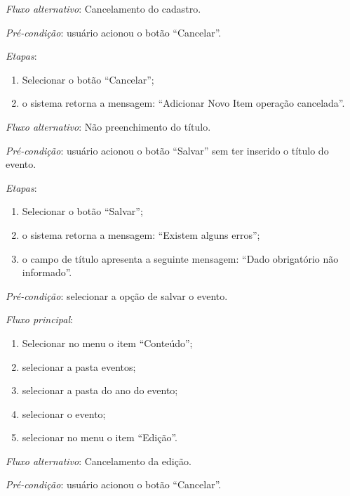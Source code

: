 \noindent \textit{Fluxo alternativo}: Cancelamento do cadastro.

\noindent \textit{Pré-condição}:  usuário acionou o botão ``Cancelar''.

\noindent \textit{Etapas}:

\begin{enumerate}
    \item Selecionar o botão ``Cancelar'';
    \item o sistema retorna a mensagem: ``Adicionar Novo Item operação cancelada''.
\end{enumerate}

\noindent \textit{Fluxo alternativo}: Não preenchimento do título.

\noindent \textit{Pré-condição}: usuário acionou o botão ``Salvar'' sem ter inserido o título do evento.

\noindent \textit{Etapas}:

\begin{enumerate}
    \item Selecionar o botão ``Salvar'';
    \item o sistema retorna a mensagem: ``Existem alguns erros'';
    \item o campo de título apresenta a seguinte mensagem: ``Dado obrigatório não informado''.
\end{enumerate}



\vspace{0.7cm}

\noindent \textit{Pré-condição}: selecionar a opção de salvar o evento.

\noindent \textit{Fluxo principal}:

\begin{enumerate}
    \item Selecionar no menu o item ``Conteúdo'';
    \item selecionar a pasta eventos;
    \item selecionar a pasta do ano do evento;
    \item selecionar o evento;
    \item selecionar no menu o item ``Edição''.
\end{enumerate}

\noindent \textit{Fluxo alternativo}: Cancelamento da edição.

\noindent \textit{Pré-condição}: usuário acionou o botão ``Cancelar''.

